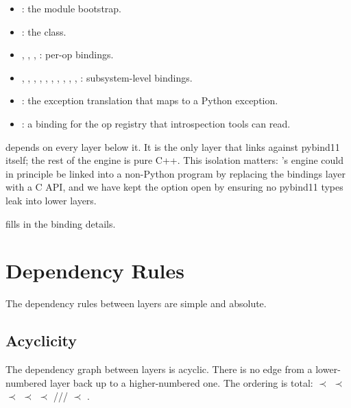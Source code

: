 \begin{itemize}
  \item {}: the module bootstrap.
  \item {}: the  class.
  \item {}, ,
    , : per-op
    bindings.
  \item {}, ,
    , ,
    , ,
    , ,
    , ,
    : subsystem-level bindings.
  \item {}: the exception translation that
    maps  to a Python exception.
  \item {}: a binding for the op
    registry that introspection tools can read.
\end{itemize}

 depends on every layer below it. It is the only
layer that links against pybind11 itself; the rest of the engine
is pure C++. This isolation matters: \Lucid's engine could in
principle be linked into a non-Python program by replacing the
bindings layer with a C API, and we have kept the option open by
ensuring no pybind11 types leak into lower layers.

 fills in the binding details.

\section{Dependency Rules}
\label{sec:layered_dag:rules}

The dependency rules between layers are simple and absolute.

\subsection{Acyclicity}
\label{ssec:layered_dag:acyclic}

The dependency graph between layers is acyclic. There is no edge
from a lower-numbered layer back up to a higher-numbered one. The
ordering is total:  $\prec$  $\prec$
 $\prec$  $\prec$ 
$\prec$ /// $\prec$
.

